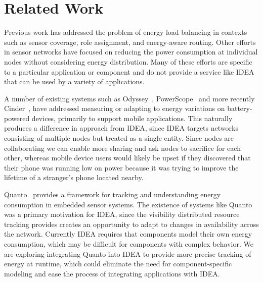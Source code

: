 \section{Related Work}
\label{sec-related}

Previous work has addressed the problem of energy load balancing in contexts
such as sensor coverage, role assignment, and energy-aware routing. Other
efforts in sensor networks have focused on reducing the power consumption at
individual nodes without considering energy distribution. Many of these
efforts are specific to a particular application or component and do not
provide a service like IDEA that can be used by a variety of applications. 


A number of existing systems such as Odyssey~\cite{odyssey-osr99},
PowerScope~\cite{powerscope-wmcsa99} and more recently
Cinder~\cite{cinder-mobiheld09}, have addressed measuring or adapting to
energy variations on battery-powered devices, primarily to support mobile
applications. This naturally produces a difference in approach from IDEA,
since IDEA targets networks consisting of multiple nodes but treated as a
single entity. Since nodes are collaborating we can enable more sharing and
ask nodes to sacrifice for each other, whereas mobile device users would
likely be upset if they discovered that their phone was running low on power
because it was trying to improve the lifetime of a stranger's phone located
nearby.

Quanto~\cite{quanto-osdi08} provides a framework for tracking and
understanding energy consumption in embedded sensor systems. The existence of
systems like Quanto was a primary motivation for IDEA, since the visibility
distributed resource tracking provides creates an opportunity to adapt to
changes in availability across the network.  Currently IDEA requires that
components model their own energy consumption, which may be difficult for
components with complex behavior.  We are exploring integrating Quanto into
IDEA to provide more precise tracking of energy at runtime, which could
eliminate the need for component-specific modeling and ease the process of
integrating applications with IDEA.


